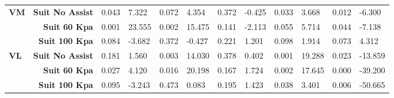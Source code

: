 \documentclass[letterpaper, 10 pt, conference]{ieeeconf}  %
\begin{document}
\begin{table*}[]
\begin{tabular}{@{}lrllllllllll@{}}
		\textbf{VM}                          & \textbf{Suit No Assist}                 & 0.043                                & 7.322                                & 0.072                                & 4.354                                & 0.372                                & -0.425                               & 0.033                                & 3.668                                & 0.012                                & -6.300                               \\
		\textbf{}                            & \textbf{Suit 60 Kpa}                    & 0.001                                & 23.555                               & 0.002                                & 15.475                               & 0.141                                & -2.113                               & 0.055                                & 5.714                                & 0.044                                & -7.138                               \\
		\textbf{}                            & \textbf{Suit 100 Kpa}                   & 0.084                                & -3.682                               & 0.372                                & -0.427                               & 0.221                                & 1.201                                & 0.098                                & 1.914                                & 0.073                                & 4.312                                \\ \midrule
		\textbf{VL}                          & \textbf{Suit No Assist}                 & 0.181                                & 1.560                                & 0.003                                & 14.030                               & 0.378                                & 0.402                                & 0.001                                & 19.288                               & 0.023                                & -13.859                              \\
		\textbf{}                            & \textbf{Suit 60 Kpa}                    & 0.027                                & 4.120                                & 0.016                                & 20.198                               & 0.167                                & 1.724                                & 0.002                                & 17.645                               & 0.000                                & -39.200                              \\
		\textbf{}                            & \textbf{Suit 100 Kpa}                   & 0.095                                & -3.243                               & 0.473                                & 0.083                                & 0.195                                & 1.423                                & 0.038                                & 3.401                                & 0.006                                & -50.665                              \\ \midrule

\end{tabular}
\end{table*}
\end{document}
